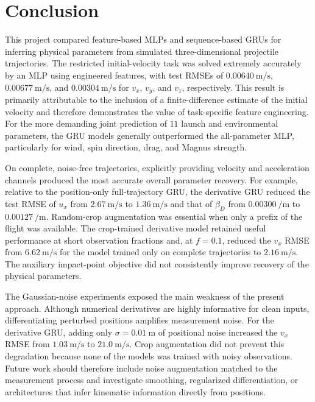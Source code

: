 \section{Conclusion}
\label{sec:conclusion}

This project compared feature-based MLPs and sequence-based GRUs for inferring physical parameters from simulated three-dimensional projectile trajectories. The restricted initial-velocity task was solved extremely accurately by an MLP using engineered features, with test RMSEs of $\SI{0.00640}{\meter\per\second}$, $\SI{0.00677}{\meter\per\second}$, and $\SI{0.00304}{\meter\per\second}$ for $v_x$, $v_y$, and $v_z$, respectively.
This result is primarily attributable to the inclusion of a finite-difference estimate of the initial velocity and therefore demonstrates the value of task-specific feature engineering. For the more demanding joint prediction of $11$ launch and environmental parameters, the GRU models generally outperformed the all-parameter MLP, particularly for wind, spin direction, drag, and Magnus strength.

On complete, noise-free trajectories, explicitly providing velocity and acceleration channels produced the most accurate overall parameter recovery. For example, relative to the position-only full-trajectory GRU, the derivative GRU reduced the test RMSE of $u_x$ from $\SI{2.67}{\meter\per\second}$ to $\SI{1.36}{\meter\per\second}$ and that of $\beta_D$ from $\SI{0.00300}{\per\meter}$ to $\SI{0.00127}{\per\meter}$.
Random-crop augmentation was essential when only a prefix of the flight was available. The crop-trained derivative model retained useful performance at short observation fractions and, at $f=0.1$, reduced the $v_x$ RMSE from $\SI{6.62}{\meter\per\second}$ for the model trained only on complete trajectories to $\SI{2.16}{\meter\per\second}$. The auxiliary impact-point objective did not consistently improve recovery of the physical parameters.

The Gaussian-noise experiments exposed the main weakness of the present approach. Although numerical derivatives are highly informative for clean inputs, differentiating perturbed positions amplifies measurement noise. For the derivative GRU, adding only $\sigma=\SI{0.01}{\meter}$ of positional noise increased the $v_x$ RMSE from $\SI{1.03}{\meter\per\second}$ to $\SI{21.0}{\meter\per\second}$. Crop augmentation did not prevent this degradation because none of the models was trained with noisy observations. Future work should therefore include noise augmentation matched to the measurement process and investigate smoothing, regularized differentiation, or architectures that infer kinematic information directly from positions.\cite{chartrand2011numerical}

